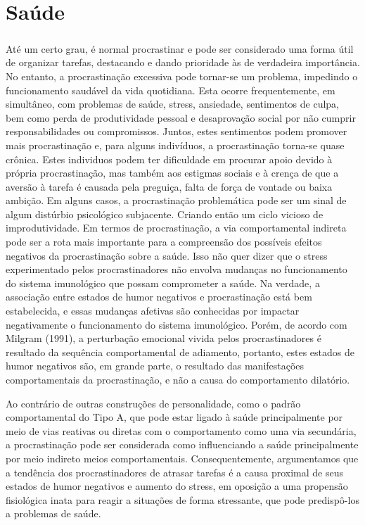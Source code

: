 \documentclass{report}
\begin{document}
\chapter{Saúde}
\label{chap.saúde}


\paragraph{}
Até um certo grau, é normal procrastinar e pode ser considerado uma forma útil de organizar tarefas, destacando e dando prioridade às de verdadeira importância. No entanto, a procrastinação excessiva pode tornar-se um problema, impedindo o funcionamento saudável da vida quotidiana. Esta ocorre frequentemente, em simultâneo, com problemas de saúde, stress, ansiedade, sentimentos de culpa, bem como perda de produtividade pessoal e desaprovação social por não cumprir responsabilidades ou compromissos. Juntos, estes sentimentos podem promover mais procrastinação e, para alguns indivíduos, a procrastinação torna-se quase crônica. Estes individuos podem ter dificuldade em procurar apoio devido à própria procrastinação, mas também aos estigmas sociais e à crença de que a aversão à tarefa é causada pela preguiça, falta de força de vontade ou baixa ambição. Em alguns casos, a procrastinação problemática pode ser um sinal de algum distúrbio psicológico subjacente. Criando então um ciclo vicioso de  improdutividade.
Em termos de procrastinação, a via comportamental indireta pode ser a rota mais importante para a compreensão dos possíveis efeitos negativos da procrastinação sobre a saúde. Isso não quer dizer que o stress experimentado pelos procrastinadores não envolva mudanças no funcionamento do sistema imunológico que possam comprometer a saúde. Na verdade, a associação entre estados de humor negativos e procrastinação está bem estabelecida, e essas mudanças afetivas são conhecidas por impactar negativamente o funcionamento do sistema imunológico. Porém, de acordo com Milgram (1991), a perturbação emocional vivida pelos procrastinadores é resultado da sequência comportamental de adiamento, portanto, estes estados de humor negativos são, em grande parte, o resultado das manifestações comportamentais da procrastinação, e não a causa do comportamento dilatório.

Ao contrário de outras construções de personalidade, como o padrão comportamental do Tipo A, que pode estar ligado à saúde principalmente por meio de vias reativas ou diretas com o comportamento como uma via secundária, a procrastinação pode ser considerada como influenciando a saúde principalmente por meio indireto meios comportamentais. Consequentemente, argumentamos que a tendência dos procrastinadores de atrasar tarefas é a causa proximal de seus estados de humor negativos e aumento do stress, em oposição a uma propensão fisiológica inata para reagir a situações de forma stressante, que pode predispô-los a problemas de saúde.
\end{document}
